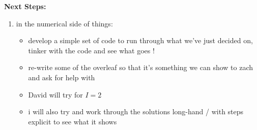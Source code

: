 \documentclass[12pt]{article}%
\begin{document}
\textbf{Next Steps:}
\begin{enumerate}
    \item in the numerical side of things: 
    \begin{itemize}
        \item develop a simple set of code to run through what we've just decided on, tinker with the code and see what goes ! 
        \item re-write some of the overleaf so that it's something we can show to zach and ask for help with 
        \item David will try for $I=2$
        \item i will also try and work through the solutions long-hand / with steps explicit to see what it shows 
    \end{itemize}
\end{enumerate}
\end{document}
